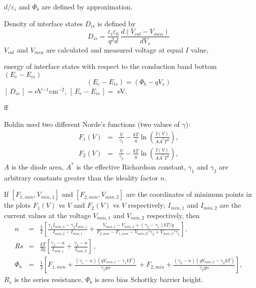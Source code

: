 \documentclass[14pt]{article}
\numberwithin{equation}{part}
\begin{document}
$d/\varepsilon_i$ and $\Phi_b$ are defined by approximation.

Density of interface states $D_{is}$ is defined by
\begin{equation*}
    D_{is}=\frac{\varepsilon_i\varepsilon_0}{q^2d}\,\frac{d(V_{cal}-V_{mea})}{d V_s}
\end{equation*}
$V_{cal}$ and $V_{mea}$ are calculated and measured voltage at equal $I$ value,

\noindent
energy of interface states with respect to the conduction band bottom $(E_c-E_{is})$
\begin{equation*}
    (E_c-E_{is})=(\Phi_b-qV_s)
\end{equation*}
$[\,D_{is}\,]= $eV$^{-1}$cm$^{-2}$, $[\,E_c-E_{is}\,]=$ eV.


ff
\pagebreak

Bohlin used two different Norde's functions (two values of $\gamma$):
\begin{eqnarray}
\label{eqBohlin}
F_1(V)&=&\frac{V}{\gamma_1}-\frac{kT}{q}\ln\left(\frac{I(V)}{AA^*T^2}\right),
\nonumber\\
F_2(V)&=&\frac{V}{\gamma_2}-\frac{kT}{q}\ln\left(\frac{I(V)}{AA^*T^2}\right),\nonumber
\end{eqnarray}
$A$ is the diode area,
$A^*$ is the effective Richardson constant,
$\gamma_1$ and $\gamma_2$ are arbitrary constants greater than the ideality factor $n$.

If $[F_{1,min}, V_{min,1}]$ and $[F_{2,min}, V_{min,2}]$ are the coordinates of minimum points in the plots $F_1(V)$ vs $V$ and $F_2(V)$ vs $V$ respectively;
$I_{min,1}$ and $I_{min,2}$ are the current values at the voltage $V_{min,1}$ and $V_{min,2}$ respectively, then
\begin{eqnarray}
\label{eqBohlinDet}
n&=&\frac{1}{2}\left[\frac{\gamma_1I_{min,2}-\gamma_2I_{min,1}}{I_{min,2}-I_{min,1}}+
\frac{V_{min,1}-V_{min,2}+(\gamma_2-\gamma_1)kT/q}{F_{2,min}-F_{1,min}-V_{min,2}/\gamma_2+V_{min,1}/\gamma_1}\right]
,\nonumber
\\
Rs&=&\frac{kT}{2q}\left[\frac{\gamma_1-n}{I_{min,1}}+\frac{\gamma_2-n}{I_{min,2}}\right]\,,\nonumber
\\
\Phi_b&=&\frac{1}{2}\left[F_{1,min}+\frac{(\gamma_1-n)(qV_{min,1}-\gamma_1kT)}{\gamma_1qn}\,+
F_{2,min}+\frac{(\gamma_2-n)(qV_{min,2}-\gamma_2kT)}{\gamma_2qn}\right],\nonumber
\end{eqnarray}
$R_s$ is the series resistance,
$\Phi_b$ is zero bias Schottky barrier height.

\pagebreak
\end{document}
